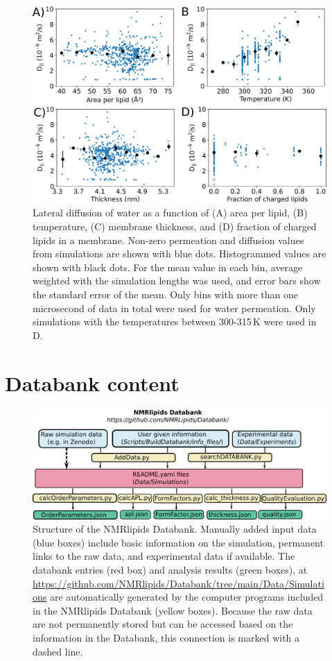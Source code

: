 \documentclass[fleqn,10pt]{wlscirepSI}
\begin{document}
\begin{figure}[!h]
    \centering
    \includegraphics[width = \textwidth]{Figures/LateralDiffusionSI.pdf}
    \caption{Lateral diffusion of water as a function of (A) area per lipid, (B) temperature, (C) membrane thickness, and (D) fraction of charged lipids in a membrane. Non-zero permeation and diffusion values from simulations are shown with blue dots. Histogrammed values are shown with black dots. For the mean value in each bin, average weighted with the simulation lengths was used, and error bars show the standard error of the mean. Only bins with more than one microsecond of data in total were used for water permeation. Only simulations with the temperatures between 300-315\,K were used in D.}
    \label{fig:diffusionSI}
\end{figure}

\pagebreak
\section{Databank content}


\begin{figure}[!h]
  \includegraphics[width=\textwidth]{Figures/DataBankChart.pdf}
  \caption{Structure of the NMRlipids Databank. Manually added input data (blue boxes) include basic information on the simulation, permanent links to the raw data, and experimental data if available. The databank entries (red box) and analysis results (green boxes), at \url{https://github.com/NMRlipids/Databank/tree/main/Data/Simulations} are automatically generated by the computer programs included in the NMRlipids Databank (yellow boxes). Because the raw data are not permanently stored but can be accessed based on the information in the Databank, this connection is marked with a dashed line.}
  \label{DatabankStructure}
\end{figure}
\end{document}
